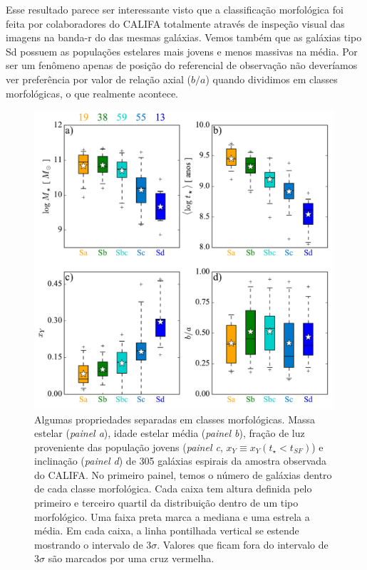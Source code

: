 Esse resultado parece ser interessante visto que a classificação morfológica foi feita por
colaboradores do CALIFA totalmente através de inspeção visual das imagens na banda-r do \SDSS das
mesmas galáxias. Vemos também que as galáxias tipo Sd possuem as populações estelares mais jovens e
menos massivas na média. Por ser um fenômeno apenas de posição do referencial de observação não
deveríamos ver preferência por valor de relação axial ($b/a$) quando dividimos em classes
morfológicas, o que realmente acontece.

\begin{figure}
	\centering
	\includegraphics[width=0.99\textwidth]{figuras/sample_realsample_maskradius_integrated.pdf}
	\caption[Classificação por morfologia.]
	{Algumas propriedades separadas em classes morfológicas. Massa estelar ({\em painel a}), idade
estelar média ({\em painel b}), fração de luz proveniente das população jovens ({\em painel c}, $x_Y
\equiv x_Y(t_\star < t_{SF})$) e inclinação ({\em painel d}) de 305 galáxias espirais da amostra
observada do CALIFA. No primeiro painel, temos o número de galáxias dentro de cada classe
morfológica. Cada caixa tem altura definida pelo primeiro e terceiro quartil da distribuição dentro
de um tipo morfológico. Uma faixa preta marca a mediana e uma estrela a média. Em cada caixa, a
linha pontilhada vertical se estende mostrando o intervalo de $3\sigma$. Valores que ficam fora do
intervalo de $3\sigma$ são marcados por uma cruz vermelha.}
	\label{fig:amostraMorf}
\end{figure}

